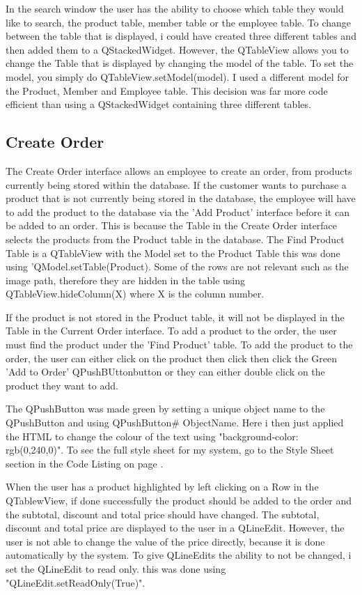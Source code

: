 In the search window the user has the ability to choose which table they would like to search, the product table, member table or the employee table. To change between the table that is displayed, i could have created three different tables and then added them to a QStackedWidget. However, the QTableView allows you to change the Table that is displayed by changing the model of the table. To set the model, you simply do QTableView.setModel(model). I used a different model for the Product, Member and Employee table. This decision was far more code efficient than using a QStackedWidget containing three different tables.

\subsection{Create Order}

The Create Order interface allows an employee to create an order, from products currently being stored within the database. If the customer wants to purchase a product that is not currently being stored in the database, the employee will have to add the product to the database via the 'Add Product' interface before it can be added to an order. This is because the Table in the Create Order interface selects the products from the Product table in the database. The Find Product Table is a QTableView with the Model set to the Product Table this was done using 'QModel.setTable(Product). Some of the rows are not relevant such as the image path, therefore they are hidden in the table using QTableView.hideColumn(X) where X is the column number. 

If the product is not stored in the Product table, it will not be displayed in the Table in the Current Order interface. To add a product to the order, the user must find the product under the 'Find Product' table. To add the product to the order, the user can either click on the product then click then click the Green 'Add to Order' QPushBUttonbutton or they can either double click on the product they want to add. 

The QPushButton was made green by setting a unique object name to the QPushButton and using QPushButton\# ObjectName. Here i then just applied the HTML to change the colour of the text using "background-color: rgb(0,240,0)". To see the full style sheet for my system, go to the Style Sheet section in the Code Listing on page \pageref{fig:style}. 

When the user has a product highlighted by left clicking on a Row in the QTablewView, if done successfully the product should be added to the order and the subtotal, discount and total price should have changed. The subtotal, discount and total price are displayed to the user in a QLineEdit. However, the user is not able to change the value of the price directly, because it is done automatically by the system. To give QLineEdits the ability to not be changed, i set the QLineEdit to read only. this was done using "QLineEdit.setReadOnly(True)".

